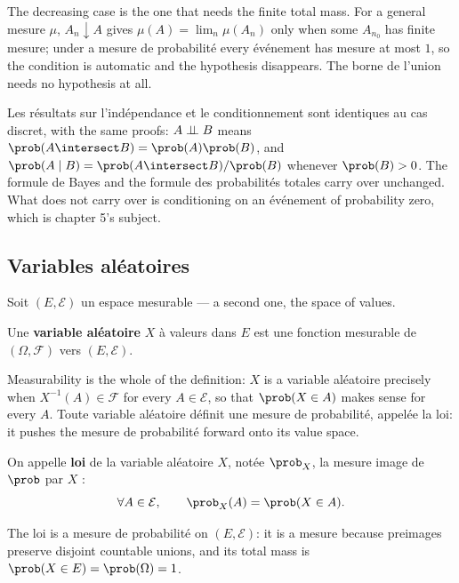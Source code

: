 \begin{remark}
  The decreasing case is the one that needs the finite total mass. For a general
  mesure $\mu$, $A_{n} \downarrow A$ gives $\mu(A) = \lim_{n} \mu(A_{n})$ only
  when some $A_{n_{0}}$ has finite mesure; under a mesure de probabilité every
  événement has mesure at most $1$, so the condition is automatic and the
  hypothesis disappears. The borne de l'union needs no hypothesis at all.
\end{remark}

Les résultats sur l'indépendance et le conditionnement sont identiques au cas
discret, with the same proofs: $A \perp\!\!\!\perp B$ means
$\prob(A \intersect B) = \prob(A)\prob(B)$, and
$\prob(A \mid B) = \prob(A \intersect B)/\prob(B)$ whenever $\prob(B) > 0$. The
formule de Bayes and the formule des probabilités totales carry over unchanged.
What does not carry over is conditioning on an événement of probability zero,
which is chapter 5's subject.

\subsection{Variables aléatoires}

Soit $(E,\mathcal{E})$ un espace mesurable --- a second one, the space of values.

\begin{definition}
  Une \textbf{variable aléatoire} $X$ à valeurs dans $E$ est une fonction
  mesurable de $(\Omega,\mathcal{F})$ vers $(E,\mathcal{E})$.
\end{definition}

Measurability is the whole of the definition: $X$ is a variable aléatoire precisely
when $X^{-1}(A) \in \mathcal{F}$ for every $A \in \mathcal{E}$, so that
$\prob(X \in A)$ makes sense for every $A$. Toute variable aléatoire définit une
mesure de probabilité, appelée la loi: it pushes the mesure de probabilité forward
onto its value space.

\begin{definition}
  On appelle \textbf{loi} de la variable aléatoire $X$, notée $\prob_{X}$, la
  mesure image de $\prob$ par $X$ :
  \[
    \forall A \in \mathcal{E}, \qquad \prob_{X}(A) = \prob(X \in A).
  \]
\end{definition}

The loi is a mesure de probabilité on $(E,\mathcal{E})$: it is a mesure because
preimages preserve disjoint countable unions, and its total mass is
$\prob(X \in E) = \prob(\Omega) = 1$.

